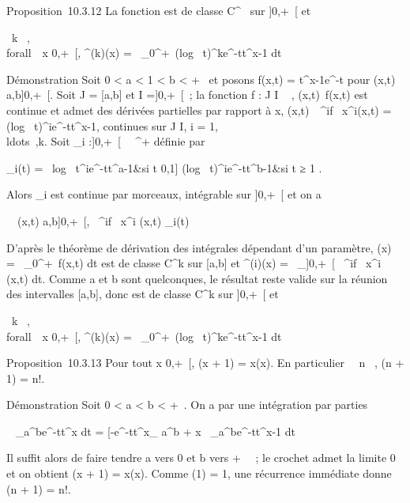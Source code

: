 \documentclass[]{article}
\begin{document}
Proposition~10.3.12 La fonction \Gamma est de classe C^\infty~ sur
{]}0,+\infty~{[} et

\forall~k \in {}~, \\forall~~x
\in{]}0,+\infty~{[}, \Gamma^(k)(x) =\int ~
_0^+\infty~(log~
t)^ke^-tt^x-1 dt

Démonstration Soit 0 \textless{} a \textless{} 1 \textless{} b
\textless{} +\infty~ et posons f(x,t) = t^x-1e^-t pour
(x,t) \in {[}a,b{]}\times{]}0,+\infty~{[}. Soit J = {[}a,b{]} et I ={]}0,+\infty~{[}~; la
fonction f : J \times I \rightarrow~ , (x,t)\mapsto~f(x,t) est
continue et admet des dérivées partielles par rapport à x,
(x,t)\mapsto~\partial~^if\over
\partial~x^i(x,t) = (log~
t)^ie^-tt^x-1, continues sur J \times I, i =
1,\\ldots~,k. Soit
\phi_i :{]}0,+\infty~{[}\rightarrow~ ~^+ définie par

 \phi_i(t) = \left \
\cases log~
t^ie^-tt^a-1&si t \in{]}0,1{]}
\cr (log~
t)^ie^-tt^b-1&si t ≥ 1 
\right .

Alors \phi_i est continue par morceaux, intégrable sur {]}0,+\infty~{[}
et on a

\forall~~(x,t) \in {[}a,b{]}\times{]}0,+\infty~{[}, 
\partial~^if \over \partial~x^i (x,t)\leq
\phi_i(t)

D'après le théorème de dérivation des intégrales dépendant d'un
paramètre, \Gamma(x) =\int ~
_0^+\infty~f(x,t) dt est de classe C^k sur {[}a,b{]}
et \Gamma^(i)(x) =\int ~
_{]}0,+\infty~{[} \partial~^if \over
\partial~x^i (x,t) dt. Comme a et b sont quelconques, le résultat
reste valide sur la réunion des intervalles {[}a,b{]}, donc \Gamma est de
classe C^k sur {]}0,+\infty~{[} et

\forall~k \in {}~, \\forall~~x
\in{]}0,+\infty~{[}, \Gamma^(k)(x) =\int ~
_0^+\infty~(log~
t)^ke^-tt^x-1 dt

Proposition~10.3.13 Pour tout x \in{]}0,+\infty~{[}, \Gamma(x + 1) = x\Gamma(x). En
particulier \forall~~n \in \mathbb{N}~, \Gamma(n + 1) = n!.

Démonstration Soit 0 \textless{} a \textless{} b \textless{} +\infty~. On a
par une intégration par parties

\int ~
_a^be^-tt^x dt =
\left
{[}-e^-tt^x\right {]}_
a^b + x\int ~
_a^be^-tt^x-1 dt

Il suffit alors de faire tendre a vers 0 et b vers + \infty~~; le crochet
admet la limite 0 et on obtient \Gamma(x + 1) = x\Gamma(x). Comme \Gamma(1) = 1, une
récurrence immédiate donne \Gamma(n + 1) = n!.
\end{document}
